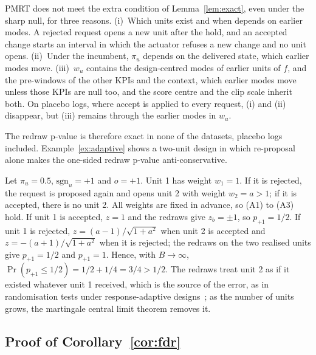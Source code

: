 PMRT does not meet the extra condition of Lemma~\ref{lem:exact}, even under the sharp null, for three reasons.
(i)~Which units exist and when depends on earlier modes. A rejected request opens a new unit after the hold, and an
accepted change starts an interval in which the actuator refuses a new change and no unit opens. (ii)~Under the
incumbent, $\pi_u$ depends on the delivered state, which earlier modes move. (iii)~$w_u$ contains the design-centred modes of earlier units of $f$, and the
pre-windows of the other KPIs and the context, which earlier modes move unless those KPIs are null
too, and the score centre and the clip scale inherit both. On placebo logs, where accept is
applied to every request, (i) and (ii) disappear, but (iii) remains through the earlier modes in
$w_u$.

The redraw p-value is therefore exact in none of the datasets, placebo logs included.
Example~\ref{ex:adaptive} shows a two-unit design in which re-proposal alone makes the one-sided redraw p-value
anti-conservative.

\begin{example}
\label{ex:adaptive}
Let $\pi_u = 0.5$, $\mathrm{sgn}_u = +1$ and $o = +1$. Unit 1 has weight $w_1 = 1$. If it is
rejected, the request is proposed again and opens unit 2 with weight $w_2 = a > 1$; if it is
accepted, there is no unit 2. All weights are fixed in advance, so (A1) to (A3) hold. If unit 1 is
accepted, $z = 1$ and the redraws give $z_b = \pm 1$, so $p_{+1} = 1/2$. If unit 1 is rejected,
$z = (a - 1)/\sqrt{1 + a^2}$ when unit 2 is accepted and $z = -(a + 1)/\sqrt{1 + a^2}$ when it is
rejected; the redraws on the two realised units give $p_{+1} = 1/2$ and $p_{+1} = 1$. Hence, with
$B \to \infty$, $\Pr(p_{+1} \le 1/2) = 1/2 + 1/4 = 3/4 > 1/2$. The redraws treat unit 2 as if it
existed whatever unit 1 received, which is the source of the error, as in randomisation tests under
response-adaptive designs~\cite{simon2011randomization}; as the number of units grows,
the martingale central limit theorem removes it.
\end{example}

\subsection{Proof of Corollary~\ref{cor:fdr}}
\label{app:proof_cor}

